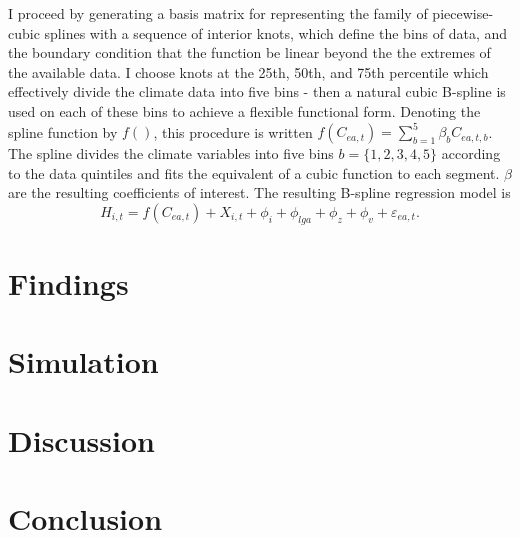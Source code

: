 \documentclass[a4paper,12pt]{article}
\theoremstyle{plain}
\theoremstyle{definition}
\theoremstyle{definition}
\theoremstyle{definition}
\theoremstyle{definition}
\begin{document}
I proceed by generating a basis matrix for representing the family of piecewise-cubic splines with a sequence of interior knots, which define the bins of data, and the boundary condition that the function be linear beyond the the extremes of the available data. I choose knots at the 25th, 50th, and 75th percentile which effectively divide the climate data into five bins - then a natural cubic B-spline is used on each of these bins to achieve a flexible functional form. Denoting the spline function by $f()$, this procedure is written $f(C_{ea,t})=\sum_{b=1}^5 \beta_b C_{ea,t,b}$. The spline divides the climate variables into five bins $b=\{1,2,3,4,5\}$ according to the data quintiles and fits the equivalent of a cubic function to each segment. $\beta$ are the resulting coefficients of interest. The resulting B-spline regression model is
\begin{equation}
    H_{i,t}= f(C_{ea,t}) + X_{i,t} + \phi_i + \phi_{lga} + \phi_z + \phi_v + \varepsilon_{ea,t}.
\end{equation}

\section{Findings}
\label{sec:findings}

\section{Simulation}
\label{sec:simulation}

\section{Discussion}
\label{sec:discussion}

\section{Conclusion}
\label{sec:conclusion}



\newpage
\small



\newpage
\appendix
\end{document}

